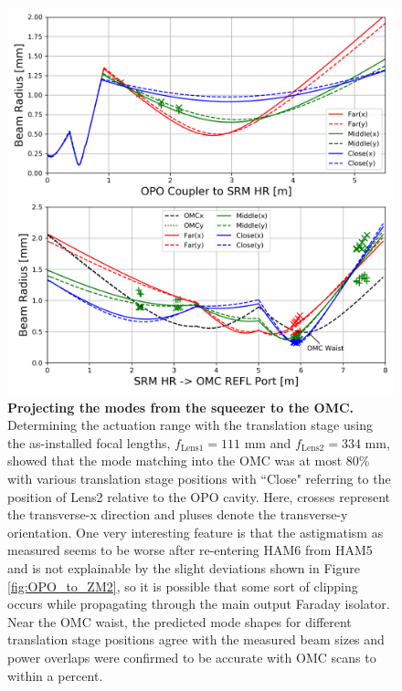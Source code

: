 	\begin{figure}[t!]
	\centering
	\includegraphics[width=0.8 \textwidth]{../Figures/OPO_to_OMCREFL_Oldlenses.png}
	\caption[Projecting the modes from the squeezer to the OMC.]  
	{\textbf{Projecting the modes from the squeezer to the OMC.}
		Determining the actuation range with the translation stage using the as-installed focal lengths, $f_{\text{Lens1}} = 111$ mm and $f_{\text{Lens2}} = 334$ mm, showed that the mode matching into the OMC was at most 80\% with various translation stage positions with ``Close" referring to the position of Lens2 relative to the OPO cavity.  Here, crosses represent the transverse-x direction and pluses denote the transverse-y orientation.  One very interesting feature is that the astigmatism as measured seems to be worse after re-entering HAM6 from HAM5 and is not explainable by the slight deviations shown in Figure \ref{fig:OPO_to_ZM2}, so it is possible that some sort of clipping occurs while propagating through the main output Faraday isolator.  Near the OMC waist, the predicted mode shapes for different translation stage positions agree with the measured beam sizes and power overlaps were confirmed to be accurate with OMC scans to within a percent.
	}
	\label{fig:OPO_to_OMC_Old}
	\end{figure}

